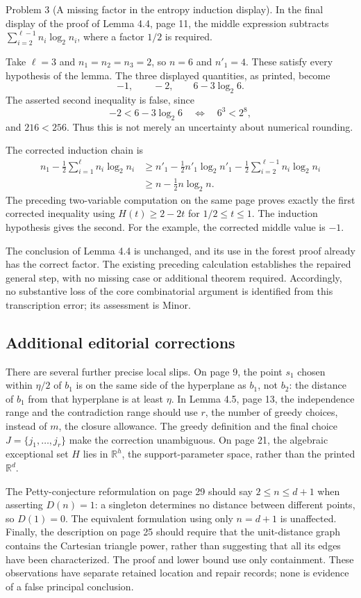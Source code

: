 \documentclass[10pt]{article}
\begin{document}
Problem 3 (A missing factor in the entropy induction display).  In the final display of the proof of Lemma 4.4, page 11, the middle expression subtracts \(\sum_{i=2}^{\ell-1}n_i\log_2 n_i\), where a factor \(1/2\) is required.\par
Take \(\ell=3\) and \(n_1=n_2=n_3=2\), so \(n=6\) and \(n'_1=4\). These satisfy every hypothesis of the lemma. The three displayed quantities, as printed, become \[-1,\qquad -2,\qquad 6-3\log_2 6.\] The asserted second inequality is false, since \[-2<6-3\log_2 6
 \quad\Longleftrightarrow\quad
 6^3<2^8,\] and \(216<256\). Thus this is not merely an uncertainty about numerical rounding.\par
The corrected induction chain is \[\begin{split}
 n_1-\frac12\sum_{i=1}^{\ell}n_i\log_2 n_i
 &\ge n'_1-\frac12n'_1\log_2 n'_1
       -\frac12\sum_{i=2}^{\ell-1}n_i\log_2 n_i\\
 &\ge n-\frac12n\log_2 n.
\end{split}\] The preceding two-variable computation on the same page proves exactly the first corrected inequality using \(H(t)\ge2-2t\) for \(1/2\le t\le1\). The induction hypothesis gives the second. For the example, the corrected middle value is \(-1\).\par
The conclusion of Lemma 4.4 is unchanged, and its use in the forest proof already has the correct factor. The existing preceding calculation establishes the repaired general step, with no missing case or additional theorem required. Accordingly, no substantive loss of the core combinatorial argument is identified from this transcription error; its assessment is Minor.\par
\subsection*{Additional editorial corrections}
There are several further precise local slips. On page 9, the point \(s_1\) chosen within \(\eta/2\) of \(b_1\) is on the same side of the hyperplane as \(b_1\), not \(b_2\): the distance of \(b_1\) from that hyperplane is at least \(\eta\). In Lemma 4.5, page 13, the independence range and the contradiction range should use \(r\), the number of greedy choices, instead of \(m\), the closure allowance. The greedy definition and the final choice \(J=\{j_1,\ldots,j_r\}\) make the correction unambiguous. On page 21, the algebraic exceptional set \(H\) lies in \(\mathbb R^h\), the support-parameter space, rather than the printed \(\mathbb R^d\).\par
The Petty-conjecture reformulation on page 29 should say \(2\le n\le d+1\) when asserting \(D(n)=1\): a singleton determines no distance between different points, so \(D(1)=0\). The equivalent formulation using only \(n=d+1\) is unaffected. Finally, the description on page 25 should require that the unit-distance graph contains the Cartesian triangle power, rather than suggesting that all its edges have been characterized. The proof and lower bound use only containment. These observations have separate retained location and repair records; none is evidence of a false principal conclusion.\par
\end{document}

